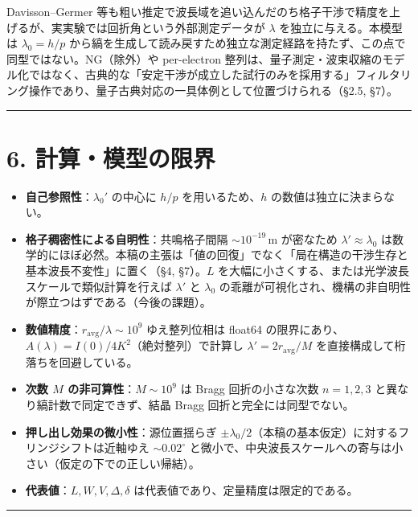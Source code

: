 \documentclass[11pt,a4paper]{ltjsarticle}
\providecommand{\tightlist}{\setlength{\itemsep}{0pt}\setlength{\parskip}{0pt}}
\begin{document}
Davisson--Germer
等も粗い推定で波長域を追い込んだのち格子干渉で精度を上げるが、実実験では回折角という外部測定データが
\(\lambda\) を独立に与える。本模型は \(\lambda_0=h/p\)
から縞を生成して読み戻すため独立な測定経路を持たず、この点で同型ではない。NG（除外）や
per-electron
整列は、量子測定・波束収縮のモデル化ではなく、古典的な「安定干渉が成立した試行のみを採用する」フィルタリング操作であり、量子古典対応の一具体例として位置づけられる（§2.5,
§7）。

\begin{center}\rule{0.5\linewidth}{0.5pt}\end{center}

\section{6.
計算・模型の限界}\label{ux8a08ux7b97ux6a21ux578bux306eux9650ux754c}

\begin{itemize}
\tightlist
\item
  \textbf{自己参照性}：\(\lambda_0'\) の中心に \(h/p\)
  を用いるため、\(h\) の数値は独立に決まらない。
\item
  \textbf{格子稠密性による自明性}：共鳴格子間隔
  \(\sim10^{-19}\,\mathrm{m}\) が密なため \(\lambda'\approx\lambda_0\)
  は数学的にほぼ必然。本稿の主張は「値の回復」でなく「局在構造の干渉生存と基本波長不変性」に置く（§4,
  §7）。\(L\)
  を大幅に小さくする、または光学波長スケールで類似計算を行えば
  \(\lambda'\) と \(\lambda_0\)
  の乖離が可視化され、機構の非自明性が際立つはずである（今後の課題）。
\item
  \textbf{数値精度}：\(r_{\mathrm{avg}}/\lambda\sim10^9\) ゆえ整列位相は
  float64 の限界にあり、\(A(\lambda)=I(0)/4K^2\)（絶対整列）で計算し
  \(\lambda'=2r_{\mathrm{avg}}/M\) を直接構成して桁落ちを回避している。
\item
  \textbf{次数 \(M\) の非可算性}：\(M\sim10^9\) は Bragg
  回折の小さな次数 \(n=1,2,3\) と異なり縞計数で同定できず、結晶 Bragg
  回折と完全には同型でない。
\item
  \textbf{押し出し効果の微小性}：源位置揺らぎ
  \(\pm\lambda_0/2\)（本稿の基本仮定）に対するフリンジシフトは近軸ゆえ
  \(\sim0.02^\circ\)
  と微小で、中央波長スケールへの寄与は小さい（仮定の下での正しい帰結）。
\item
  \textbf{代表値}：\(L,W,V,\Delta,\delta\)
  は代表値であり、定量精度は限定的である。
\end{itemize}

\begin{center}\rule{0.5\linewidth}{0.5pt}\end{center}
\end{document}
